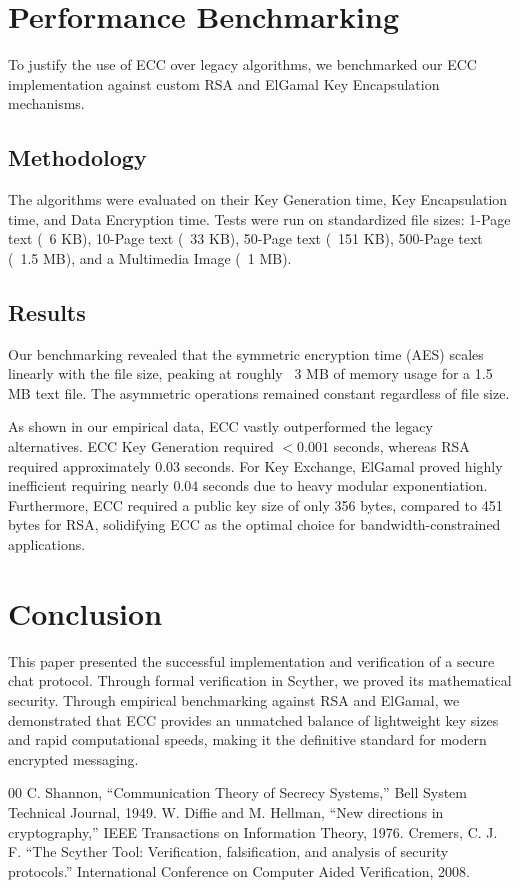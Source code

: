 \documentclass[conference]{IEEEtran}
\begin{document}
\section{Performance Benchmarking}
To justify the use of ECC over legacy algorithms, we benchmarked our ECC implementation against custom RSA and ElGamal Key Encapsulation mechanisms. 

\subsection{Methodology}
The algorithms were evaluated on their Key Generation time, Key Encapsulation time, and Data Encryption time. Tests were run on standardized file sizes: 1-Page text (~6 KB), 10-Page text (~33 KB), 50-Page text (~151 KB), 500-Page text (~1.5 MB), and a Multimedia Image (~1 MB). 

\subsection{Results}
Our benchmarking revealed that the symmetric encryption time (AES) scales linearly with the file size, peaking at roughly ~3 MB of memory usage for a 1.5 MB text file. The asymmetric operations remained constant regardless of file size.

As shown in our empirical data, ECC vastly outperformed the legacy alternatives. ECC Key Generation required $<0.001$ seconds, whereas RSA required approximately $0.03$ seconds. For Key Exchange, ElGamal proved highly inefficient requiring nearly $0.04$ seconds due to heavy modular exponentiation. Furthermore, ECC required a public key size of only 356 bytes, compared to 451 bytes for RSA, solidifying ECC as the optimal choice for bandwidth-constrained applications.

\section{Conclusion}
This paper presented the successful implementation and verification of a secure chat protocol. Through formal verification in Scyther, we proved its mathematical security. Through empirical benchmarking against RSA and ElGamal, we demonstrated that ECC provides an unmatched balance of lightweight key sizes and rapid computational speeds, making it the definitive standard for modern encrypted messaging.

\begin{thebibliography}{00}
 C. Shannon, ``Communication Theory of Secrecy Systems,'' Bell System Technical Journal, 1949.
 W. Diffie and M. Hellman, ``New directions in cryptography,'' IEEE Transactions on Information Theory, 1976.
 Cremers, C. J. F. ``The Scyther Tool: Verification, falsification, and analysis of security protocols.'' International Conference on Computer Aided Verification, 2008.
\end{thebibliography}
\end{document}
